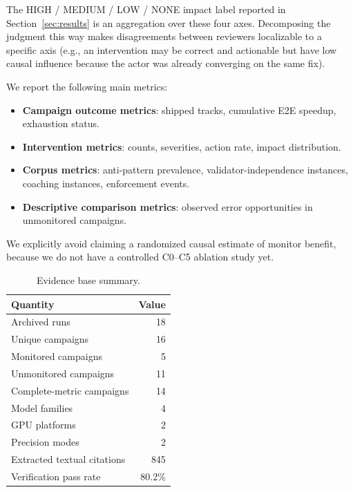 \documentclass[11pt]{article}
\begin{document}
The HIGH / MEDIUM / LOW / NONE impact label reported in Section~\ref{sec:results} is an aggregation over these four axes. Decomposing the judgment this way makes disagreements between reviewers localizable to a specific axis (e.g., an intervention may be correct and actionable but have low causal influence because the actor was already converging on the same fix).

We report the following main metrics:

\begin{itemize}[leftmargin=*,itemsep=2pt]
  \item \textbf{Campaign outcome metrics}: shipped tracks, cumulative E2E speedup, exhaustion status.
  \item \textbf{Intervention metrics}: counts, severities, action rate, impact distribution.
  \item \textbf{Corpus metrics}: anti-pattern prevalence, validator-independence instances, coaching instances, enforcement events.
  \item \textbf{Descriptive comparison metrics}: observed error opportunities in unmonitored campaigns.
\end{itemize}

We explicitly avoid claiming a randomized causal estimate of monitor benefit, because we do not have a controlled C0--C5 ablation study yet.

\begin{table}[h]
\centering
\caption{Evidence base summary.}
\label{tab:evidence-base}
\small
\begin{tabular}{@{}lr@{}}
\toprule
\textbf{Quantity} & \textbf{Value} \\
\midrule
Archived runs & 18 \\
Unique campaigns & 16 \\
Monitored campaigns & 5 \\
Unmonitored campaigns & 11 \\
Complete-metric campaigns & 14 \\
Model families & 4 \\
GPU platforms & 2 \\
Precision modes & 2 \\
Extracted textual citations & 845 \\
Verification pass rate & 80.2\% \\
\bottomrule
\end{tabular}
\end{table}

\end{document}
